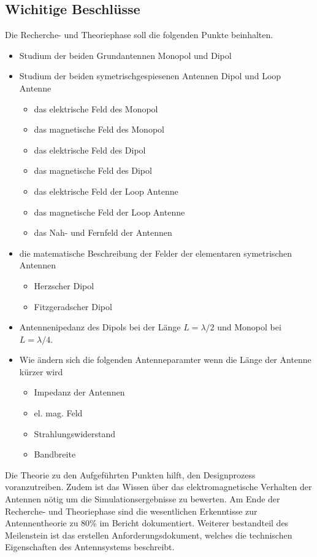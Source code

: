 \subsection{Wichitige Beschlüsse}
Die Recherche- und Theoriephase soll die folgenden Punkte beinhalten. 
\begin{itemize}
	\item Studium der beiden Grundantennen Monopol und Dipol
	\item Studium der beiden symetrischgespiesenen Antennen Dipol und Loop Antenne
	\begin{itemize}
		\item das elektrische Feld des Monopol
		\item das magnetische Feld des Monopol
		\item das elektrische Feld des Dipol
		\item das magnetische Feld des Dipol
		\item das elektrische Feld der Loop Antenne
		\item das magnetische Feld der Loop Antenne
		\item das Nah- und Fernfeld der Antennen
	\end{itemize}
		\item die matematische Beschreibung der Felder der elementaren symetrischen Antennen
		\begin{itemize}
		\item Herzscher Dipol
		\item Fitzgeradscher Dipol
		\end{itemize}
		\item Antennenipedanz des Dipols bei der Länge  $L=\lambda / 2$ und Monopol bei $L=\lambda / 4$.
		\item Wie ändern sich die folgenden Antenneparamter wenn die Länge der Antenne kürzer wird
	\begin{itemize}
		\item Impedanz der Antennen
		\item el. mag. Feld
		\item Strahlungswiderstand
		\item Bandbreite
	\end{itemize}
\end{itemize}
Die Theorie zu den Aufgeführten Punkten hilft, den Designprozess voranzutreiben. Zudem ist das Wissen über das elektromagnetische Verhalten der  Antennen nötig um die Simulationsergebnisse zu bewerten. Am Ende der Recherche- und Theoriephase sind die wesentlichen Erkenntisse zur Antennentheorie zu 80\% im Bericht dokumentiert. Weiterer bestandteil des Meilenstein ist das erstellen  Anforderungsdokument, welches die technischen Eigenschaften des Antennsystems beschreibt.\\
